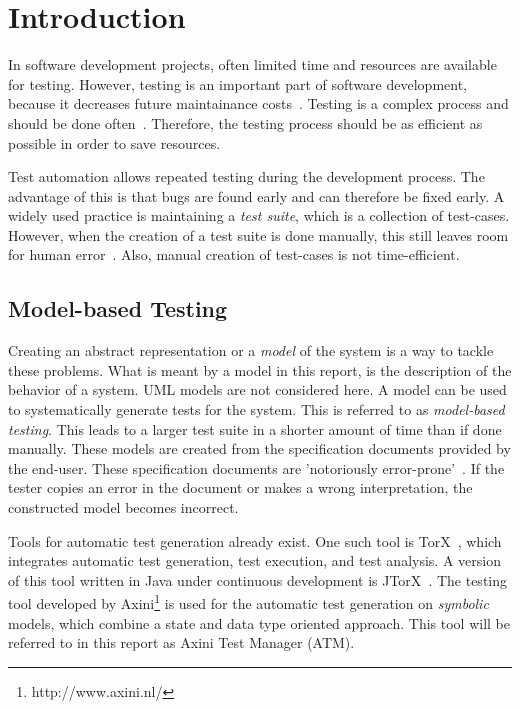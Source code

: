 \section{Introduction}
In software development projects, often limited time and resources are available for testing. However, testing is an important part of software development, because it decreases future maintainance costs~\cite{McConnell:testing}. Testing is a complex process and should be done often~\cite{Pol:testing}. Therefore, the testing process should be as efficient as possible in order to save resources.

Test automation allows repeated testing during the development process. The advantage of this is that bugs are found early and can therefore be fixed early.  A widely used practice is maintaining a \textit{test suite}, which is a collection of test-cases. However, when the creation of a test suite is done manually, this still leaves room for human error~\cite{Blackburn:testing}. Also, manual creation of test-cases is not time-efficient.

\subsection{Model-based Testing}
Creating an abstract representation or a \textit{model} of the system is a way to tackle these problems. What is meant by a model in this report, is the description of the behavior of a system. UML models are not considered here. A model can be used to systematically generate tests for the system. This is referred to as \textit{model-based testing}. This leads to a larger test suite in a shorter amount of time than if done manually. These models are created from the specification documents provided by the end-user. These specification documents are 'notoriously error-prone'~\cite{McCabe:testing}. If the tester copies an error in the document or makes a wrong interpretation, the constructed model becomes incorrect.

Tools for automatic test generation already exist. One such tool is TorX~\cite{Tretmans:TorX}, which integrates automatic test generation, test execution, and test analysis. A version of this tool written in Java under continuous development is JTorX~\cite{Belinfante:JTorX}. The testing tool developed by Axini\footnote{http://www.axini.nl/} is used for the automatic test generation on \textit{symbolic} models, which combine a state and data type oriented approach. This tool will be referred to in this report as Axini Test Manager (ATM).

